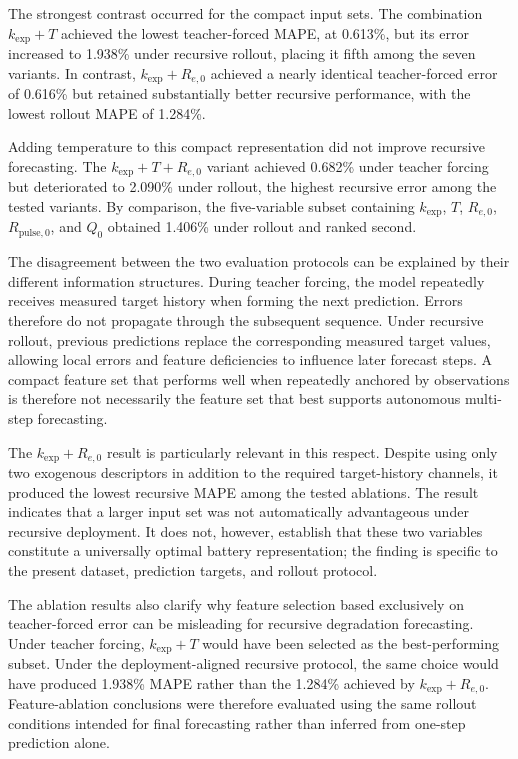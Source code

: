 \documentclass[a4paper,fleqn]{cas-sc}
\begin{document}
The strongest contrast occurred for the compact input sets. The combination $k_{\mathrm{exp}}+T$ achieved the lowest teacher-forced MAPE, at 0.613\%, but its error increased to 1.938\% under recursive rollout, placing it fifth among the seven variants. In contrast, $k_{\mathrm{exp}}+R_{e,0}$ achieved a nearly identical teacher-forced error of 0.616\% but retained substantially better recursive performance, with the lowest rollout MAPE of 1.284\%.

Adding temperature to this compact representation did not improve recursive forecasting. The $k_{\mathrm{exp}}+T+R_{e,0}$ variant achieved 0.682\% under teacher forcing but deteriorated to 2.090\% under rollout, the highest recursive error among the tested variants. By comparison, the five-variable subset containing $k_{\mathrm{exp}}$, $T$, $R_{e,0}$, $R_{\mathrm{pulse},0}$, and $Q_0$ obtained 1.406\% under rollout and ranked second.


The disagreement between the two evaluation protocols can be explained by their different information structures. During teacher forcing, the model repeatedly receives measured target history when forming the next prediction. Errors therefore do not propagate through the subsequent sequence. Under recursive rollout, previous predictions replace the corresponding measured target values, allowing local errors and feature deficiencies to influence later forecast steps. A compact feature set that performs well when repeatedly anchored by observations is therefore not necessarily the feature set that best supports autonomous multi-step forecasting.

The $k_{\mathrm{exp}}+R_{e,0}$ result is particularly relevant in this respect. Despite using only two exogenous descriptors in addition to the required target-history channels, it produced the lowest recursive MAPE among the tested ablations. The result indicates that a larger input set was not automatically advantageous under recursive deployment. It does not, however, establish that these two variables constitute a universally optimal battery representation; the finding is specific to the present dataset, prediction targets, and rollout protocol.

The ablation results also clarify why feature selection based exclusively on teacher-forced error can be misleading for recursive degradation forecasting. Under teacher forcing, $k_{\mathrm{exp}}+T$ would have been selected as the best-performing subset. Under the deployment-aligned recursive protocol, the same choice would have produced 1.938\% MAPE rather than the 1.284\% achieved by $k_{\mathrm{exp}}+R_{e,0}$. Feature-ablation conclusions were therefore evaluated using the same rollout conditions intended for final forecasting rather than inferred from one-step prediction alone.
\end{document}
